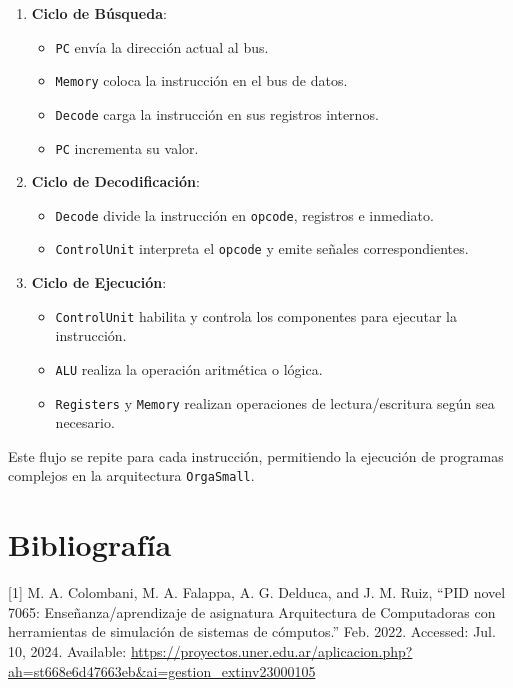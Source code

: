 \documentclass[12pt,twoside]{templates/unerthesis}
\providecommand{\tightlist}{%
  \setlength{\itemsep}{0pt}\setlength{\parskip}{0pt}}
\begin{document}
\begin{enumerate}
\def\labelenumi{\arabic{enumi}.}
\tightlist
\item
  \textbf{Ciclo de Búsqueda}:

  \begin{itemize}
  \tightlist
  \item
    \texttt{PC} envía la dirección actual al bus.
  \item
    \texttt{Memory} coloca la instrucción en el bus de datos.
  \item
    \texttt{Decode} carga la instrucción en sus registros internos.
  \item
    \texttt{PC} incrementa su valor.
  \end{itemize}
\item
  \textbf{Ciclo de Decodificación}:

  \begin{itemize}
  \tightlist
  \item
    \texttt{Decode} divide la instrucción en \texttt{opcode}, registros e inmediato.
  \item
    \texttt{ControlUnit} interpreta el \texttt{opcode} y emite señales correspondientes.
  \end{itemize}
\item
  \textbf{Ciclo de Ejecución}:

  \begin{itemize}
  \tightlist
  \item
    \texttt{ControlUnit} habilita y controla los componentes para ejecutar la instrucción.
  \item
    \texttt{ALU} realiza la operación aritmética o lógica.
  \item
    \texttt{Registers} y \texttt{Memory} realizan operaciones de lectura/escritura según sea necesario.
  \end{itemize}
\end{enumerate}

Este flujo se repite para cada instrucción, permitiendo la ejecución de programas complejos en la arquitectura \texttt{OrgaSmall}.

\hypertarget{bibliografuxeda}{%
\chapter*{Bibliografía}\label{bibliografuxeda}}

\hypertarget{refs}{}
\leavevmode\hypertarget{ref-colombani_pid_2022}{}%
{[}1{]} M. A. Colombani, M. A. Falappa, A. G. Delduca, and J. M. Ruiz, ``PID novel 7065: Enseñanza/aprendizaje de asignatura Arquitectura de Computadoras con herramientas de simulación de sistemas de cómputos.'' Feb. 2022. Accessed: Jul. 10, 2024. Available: \href{https://proyectos.uner.edu.ar/aplicacion.php?ah=st668e6d47663eb\&ai=gestion_extinv\%7C\%7C23000105}{https://proyectos.uner.edu.ar/aplicacion.php?ah=st668e6d47663eb\&ai=gestion\_extinv\textbar{}\textbar{}23000105}
\end{document}
